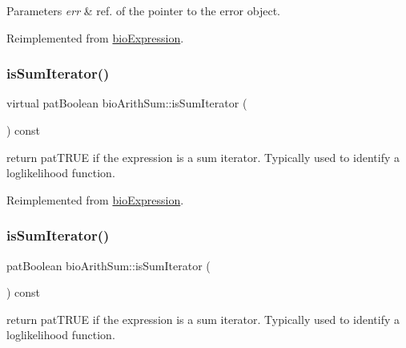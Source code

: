 \begin{DoxyParams}{Parameters}
{\em err} & ref. of the pointer to the error object. \\
\hline
\end{DoxyParams}


Reimplemented from \hyperlink{classbio_expression_af58662a5d4d456f15bc4f2c9bd4f8a5b}{bio\+Expression}.

\mbox{\label{classbio_arith_sum_ab0747dc4d0f4fbe2cb246b265ec3cd11}} 
\subsubsection{\texorpdfstring{is\+Sum\+Iterator()}{isSumIterator()}\hspace{0.1cm}{\footnotesize\ttfamily [1/4]}}
{\footnotesize\ttfamily virtual pat\+Boolean bio\+Arith\+Sum\+::is\+Sum\+Iterator (\begin{DoxyParamCaption}{ }\end{DoxyParamCaption}) const\hspace{0.3cm}{\ttfamily [virtual]}}

return pat\+T\+R\+UE if the expression is a sum iterator. Typically used to identify a loglikelihood function. 

Reimplemented from \hyperlink{classbio_expression_aee422b6c10811d2478972c83300acbb0}{bio\+Expression}.

\mbox{\label{classbio_arith_sum_a57d25760240c2d93b414d79679cfa5a3}} 
\subsubsection{\texorpdfstring{is\+Sum\+Iterator()}{isSumIterator()}\hspace{0.1cm}{\footnotesize\ttfamily [2/4]}}
{\footnotesize\ttfamily pat\+Boolean bio\+Arith\+Sum\+::is\+Sum\+Iterator (\begin{DoxyParamCaption}{ }\end{DoxyParamCaption}) const\hspace{0.3cm}{\ttfamily [virtual]}}

return pat\+T\+R\+UE if the expression is a sum iterator. Typically used to identify a loglikelihood function. 


